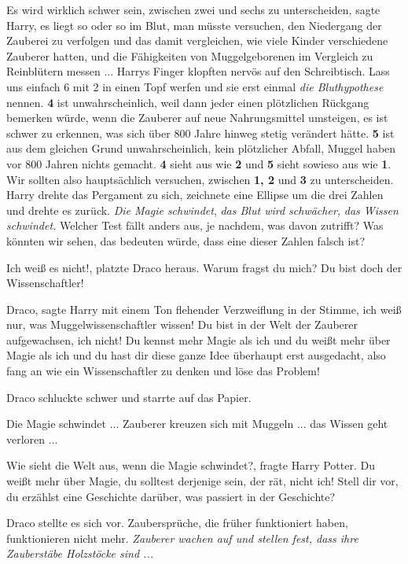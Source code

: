 \glqq{}Es wird wirklich schwer sein, zwischen zwei und sechs zu
unterscheiden\grqq{}, sagte Harry, \glqq{}es liegt so oder so im Blut, man
müsste versuchen, den Niedergang der Zauberei zu verfolgen und das damit
vergleichen, wie viele Kinder verschiedene Zauberer hatten, und die Fähigkeiten
von Muggelgeborenen im Vergleich zu Reinblütern messen ...\grqq{} Harrys Finger
klopften nervös auf den Schreibtisch. \glqq{}Lass uns einfach 6 mit 2 in einen
Topf werfen und sie erst einmal \emph{die Bluthypothese} nennen. \textbf{4} ist
unwahrscheinlich, weil dann jeder einen plötzlichen Rückgang bemerken würde,
wenn die Zauberer auf neue Nahrungsmittel umsteigen, es ist schwer zu erkennen,
was sich über 800 Jahre hinweg stetig verändert hätte. \textbf{5} ist aus dem
gleichen Grund unwahrscheinlich, kein plötzlicher Abfall, Muggel haben vor 800
Jahren nichts gemacht. \textbf{4} sieht aus wie \textbf{2} und \textbf{5} sieht
sowieso aus wie \textbf{1}. Wir sollten also hauptsächlich versuchen, zwischen
\textbf{1, 2} und \textbf{3} zu unterscheiden.\grqq{} Harry drehte das Pergament
zu sich, zeichnete eine Ellipse um die drei Zahlen und drehte es zurück. \glqq{}
\emph{Die Magie schwindet}, \emph{das Blut wird schwächer,} \emph{das Wissen
schwindet.} Welcher Test fällt anders aus, je nachdem, was davon zutrifft? Was
könnten wir sehen, das bedeuten würde, dass eine dieser Zahlen falsch
ist?\grqq{}

\glqq{}Ich weiß es nicht!\grqq{}, platzte Draco heraus. \glqq{}Warum fragst du
mich? Du bist doch der Wissenschaftler!\grqq{}

\glqq{}Draco\grqq{}, sagte Harry mit einem Ton flehender Verzweiflung in der
Stimme, \glqq{}ich weiß nur, was Muggelwissenschaftler wissen! Du bist in der
Welt der Zauberer aufgewachsen, ich nicht! Du kennst mehr Magie als ich und du
weißt mehr über Magie als ich und du hast dir diese ganze Idee überhaupt erst
ausgedacht, also fang an wie ein Wissenschaftler zu denken und löse das
Problem!\grqq{}

Draco schluckte schwer und starrte auf das Papier.

Die Magie schwindet ... Zauberer kreuzen sich mit Muggeln ... das Wissen geht
verloren ...

\glqq{}Wie sieht die Welt aus, wenn die Magie schwindet?\grqq{}, fragte Harry
Potter. \glqq{}Du weißt mehr über Magie, du solltest derjenige sein, der rät,
nicht ich! Stell dir vor, du erzählst eine Geschichte darüber, was passiert in
der Geschichte?\grqq{}

Draco stellte es sich vor. \glqq{}Zaubersprüche, die früher funktioniert haben,
funktionieren nicht mehr.\grqq{} \emph{Zauberer wachen auf und stellen fest,
dass ihre Zauberstäbe Holzstöcke sind ...}

